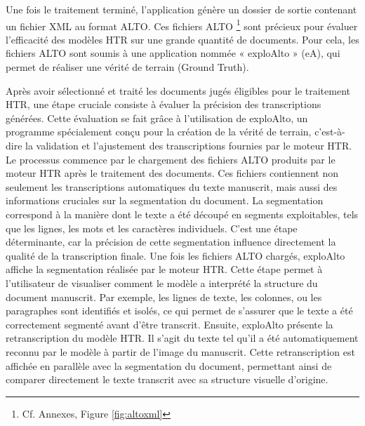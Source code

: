 \documentclass[a4paper,12pt,twoside]{book}
\begin{document}
	Une fois le traitement terminé, l'application génère un dossier de sortie contenant un fichier XML au format ALTO. Ces fichiers ALTO \footnote{Cf. Annexes, Figure \ref{fig:altoxml}} sont précieux pour évaluer l'efficacité des modèles HTR sur une grande quantité de documents. Pour cela, les fichiers ALTO sont soumis à une application nommée « exploAlto » (eA), qui permet de réaliser une vérité de terrain (Ground Truth).
	
	Après avoir sélectionné et traité les documents jugés éligibles pour le traitement HTR, une étape cruciale consiste à évaluer la précision des transcriptions générées. Cette évaluation se fait grâce à l’utilisation de exploAlto, un programme spécialement conçu pour la création de la vérité de terrain, c’est-à-dire la validation et l’ajustement des transcriptions fournies par le moteur HTR.
	\\
	
	Le processus commence par le chargement des fichiers ALTO produits par le moteur HTR après le traitement des documents. Ces fichiers contiennent non seulement les transcriptions automatiques du texte manuscrit, mais aussi des informations cruciales sur la segmentation du document. La segmentation correspond à la manière dont le texte a été découpé en segments exploitables, tels que les lignes, les mots et les caractères individuels. C’est une étape déterminante, car la précision de cette segmentation influence directement la qualité de la transcription finale. Une fois les fichiers ALTO chargés, exploAlto affiche la segmentation réalisée par le moteur HTR. Cette étape permet à l’utilisateur de visualiser comment le modèle a interprété la structure du document manuscrit. Par exemple, les lignes de texte, les colonnes, ou les paragraphes sont identifiés et isolés, ce qui permet de s’assurer que le texte a été correctement segmenté avant d’être transcrit. Ensuite, exploAlto présente la retranscription du modèle HTR. Il s’agit du texte tel qu’il a été automatiquement reconnu par le modèle à partir de l’image du manuscrit. Cette retranscription est affichée en parallèle avec la segmentation du document, permettant ainsi de comparer directement le texte transcrit avec sa structure visuelle d’origine.
	\\
	
\end{document}
